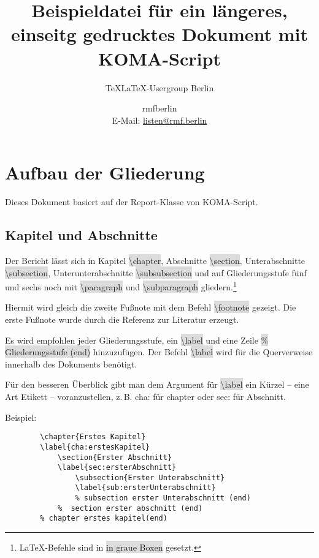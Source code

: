 \documentclass[12pt,	%
				headings=small,		%
				toc=bibliography,	%
			]	%
{scrreprt}		%
\title{Beispieldatei für ein längeres, einseitg gedrucktes Dokument mit KOMA-Script}
\subtitle{TeXLaTeX-Usergroup Berlin}
\author{rmfberlin\\\small{E-Mail: \url{listen@rmf.berlin}}}
\date{\small{\version}}
\newcommand{\inlinecode}[1]{\colorbox{Gainsboro}{\textsf{\textbackslash#1}}} %
\begin{document}
\maketitle
\tableofcontents
\chapter{Aufbau  der Gliederung} %
	\label{cha:aufbauGliederung}
	Dieses Dokument basiert auf der Report-Klasse von KOMA-Script. \autocite{komascript:doku}	%
	\section{Kapitel und Abschnitte}
	\label{sec:KapitelAbschnitte}
			Der Bericht lässt sich in Kapitel \inlinecode{chapter}, Abschnitte \inlinecode{section}, Unterabschnitte \inlinecode{subsection}, Unterunterabschnitte \inlinecode{subsubsection} und auf Gliederungsstufe fünf und sechs noch mit \inlinecode{paragraph} und \inlinecode{subparagraph} gliedern.\footnote{\LaTeX-Befehle sind in \colorbox{Gainsboro}{in graue Boxen} gesetzt.} 
			
			Hiermit wird gleich die zweite Fußnote mit dem Befehl \inlinecode{footnote} gezeigt. Die erste Fußnote wurde durch die Referenz zur Literatur erzeugt.
			
			Es wird empfohlen jeder Gliederungsstufe, ein  \inlinecode{label} und eine Zeile \colorbox{Gainsboro}{\textsf{\% Gliederungsstufe (end)}} hinzuzufügen. Der Befehl \inlinecode{label} wird für die Querverweise innerhalb des Dokuments benötigt.\autocite[40]{schlosser:einfuehrung}
			
			Für den besseren Überblick gibt man dem Argument für \inlinecode{label} ein Kürzel -- eine Art Etikett -- voranzustellen, z.\,B. cha: für chapter oder sec: für Abschnitt.\autocite[71]{schlosser:einfuehrung}

	Beispiel:
	
	\begin{lstlisting}
		\chapter{Erstes Kapitel}
		\label{cha:erstesKapitel}
			\section{Erster Abschnitt}
			\label{sec:ersterAbschnitt}
				\subsection{Erster Unterabschnitt}
				\label{sub:ersterUnterabschnitt}
				% subsection erster Unterabschnitt (end)
			%  section erster abschnitt (end)
		% chapter erstes kapitel(end)
	\end{lstlisting}
\end{document}
